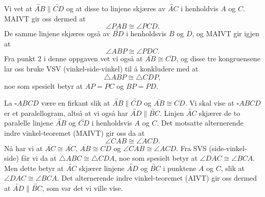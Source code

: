 \begin{oppgave}[5.1.2]
\begin{enumerate}
        Vi vet at $\overleftrightarrow{AB}\parallel\overleftrightarrow{CD}$ og at disse to linjene skjæres av $\overleftrightarrow{AC}$ i henholdvis $A$ og $C$. 
        MAIVT gir oss dermed at 
        $$\angle PAB\cong \angle PCD.$$
        De samme linjene skjæres også av $\overleftrightarrow{BD}$ i henholdsvis $B$ og $D$, og MAIVT gir igjen at 
        $$\angle ABP\cong \angle PDC.$$
        Fra punkt 2 i denne oppgaven vet vi også at $\overline{AB}\cong \overline{CD}$, 
        og disse tre kongruensene lar oss bruke VSV (vinkel-side-vinkel) til å konkludere med at 
        $$\triangle ABP\cong \triangle CDP,$$
        noe som spesielt betyr at $AP=PC$ og $BP=PD$.  
    \end{enumerate}
\end{oppgave}

\begin{oppgave}[5.1.3]
    La $\square ABCD$ være en firkant slik at $\overleftrightarrow{AB}\parallel\overleftrightarrow{CD}$ og $\overline{AB}\cong \overline{CD}$. 
    Vi skal vise at $\square ABCD$ er et paralellogram, altså at vi også har $\overleftrightarrow{AD}\parallel\overleftrightarrow{BC}$. 
    Linjen $\overleftrightarrow{AC}$ skjærer de to paralelle linjene $\overleftrightarrow{AB}$ og $\overleftrightarrow{CD}$ i henholdsvis $A$ og $C$. 
    Det motsatte alternerende indre vinkel-teoremet (MAIVT) gir oss da at 
    $$\angle CAB\cong \angle ACD.$$
    Nå har vi at $\overline{AC}\cong \overline{AC}$, $\overline{AB}\cong \overline{CD}$ og $\angle CAB\cong \angle ACD$. 
    Fra SVS (side-vinkel-side) får vi da at $\triangle ABC\cong\triangle CDA$, noe som spesielt betyr at $\angle DAC\cong \angle BCA$. 
    Men dette betyr at $\overleftrightarrow{AC}$ skjærer linjene $\overleftrightarrow{AD}$ og $\overleftrightarrow{BC}$ i punktene $A$ og $C$, slik at $\angle DAC\cong \angle BCA$. 
    Det alternerende indre vinkel-teoremet (AIVT) gir oss dermed at $\overleftrightarrow{AD}\parallel\overleftrightarrow{BC}$, som var det vi ville vise. 
\end{oppgave}